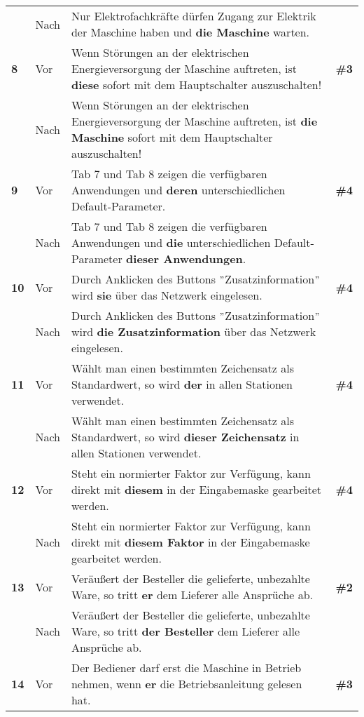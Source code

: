 \begin{longtable}{llp{}l}
& Nach & Nur Elektrofachkräfte dürfen Zugang zur Elektrik der Maschine haben und \textbf{die Maschine} warten. & \\
\tablevspace
{ \textbf{8}} & Vor & Wenn Störungen an der elektrischen Energieversorgung der Maschine auftreten, ist \textbf{diese} sofort mit dem Hauptschalter auszuschalten! & \textbf{\#3}\\
& Nach & Wenn Störungen an der elektrischen Energieversorgung der Maschine auftreten, ist \textbf{die Maschine} sofort mit dem Hauptschalter auszuschalten! & \\
\tablevspace
{ \textbf{9}} & Vor & Tab 7 und Tab 8 zeigen die verfügbaren Anwendungen und \textbf{deren} unterschiedlichen Default-Parameter. & \textbf{\#4}\\
& Nach & Tab 7 und Tab 8 zeigen die verfügbaren Anwendungen und \textbf{die} unterschiedlichen Default-Parameter \textbf{dieser Anwendungen}. & \\
\tablevspace
{ \textbf{10}} & Vor & Durch Anklicken des Buttons $"$Zusatzinformation$"$ wird \textbf{sie} über das Netzwerk eingelesen. & \textbf{\#4}\\
& Nach & Durch Anklicken des Buttons $"$Zusatzinformation$"$ wird \textbf{die Zusatzinformation} über das Netzwerk eingelesen. & \\
\tablevspace
{ \textbf{11}} & Vor & Wählt man einen bestimmten Zeichensatz als Standardwert, so wird \textbf{der} in allen Stationen verwendet. & \textbf{\#4}\\
& Nach & Wählt man einen bestimmten Zeichensatz als Standardwert, so wird \textbf{dieser Zeichensatz} in allen Stationen verwendet. & \\
\tablevspace
{ \textbf{12}} & Vor & Steht ein normierter Faktor zur Verfügung, kann direkt mit \textbf{diesem} in der Eingabemaske gearbeitet werden. & \textbf{\#4}\\
& Nach & Steht ein normierter Faktor zur Verfügung, kann direkt mit \textbf{diesem Faktor} in der Eingabemaske gearbeitet werden. & \\
\tablevspace
{ \textbf{13}} & Vor & Veräußert der Besteller die gelieferte, unbezahlte Ware, so tritt \textbf{er} dem Lieferer alle Ansprüche ab. & \textbf{\#2}\\
& Nach & Veräußert der Besteller die gelieferte, unbezahlte Ware, so tritt \textbf{der Besteller} dem Lieferer alle Ansprüche ab. & \\
\tablevspace
{ \textbf{14}} & Vor & Der Bediener darf erst die Maschine in Betrieb nehmen, wenn \textbf{er} die Betriebsanleitung gelesen hat. & \textbf{\#3}\\

\end{longtable}
